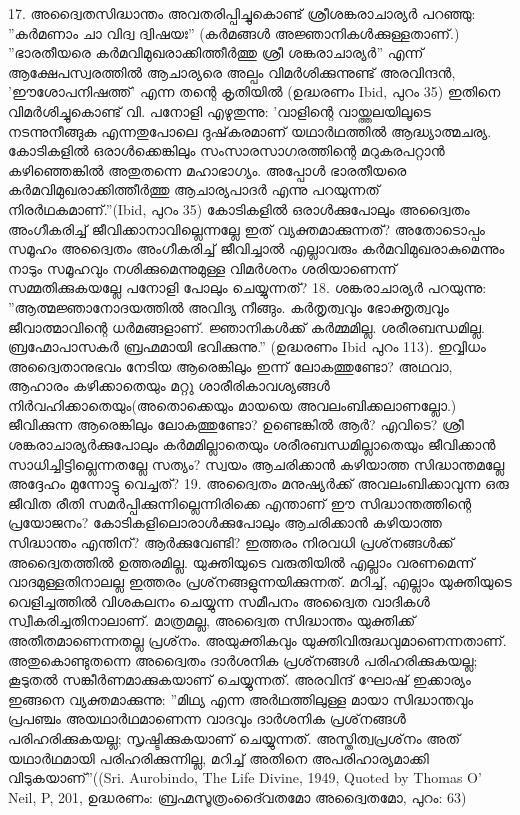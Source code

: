 17. അദ്വൈതസിദ്ധാന്തം അവതരിപ്പിച്ചുകൊണ്ട് ശ്രീശങ്കരാചാര്യര്‍ പറഞ്ഞു: ''കര്‍മണാം ചാ വിദ്വ ദ്വിഷയഃ'' (കര്‍മങ്ങള്‍ അജ്ഞാനികള്‍ക്കുള്ളതാണ്.)
''ഭാരതീയരെ കര്‍മവിമുഖരാക്കിത്തീര്‍ത്തു ശ്രീ ശങ്കരാചാര്യര്‍'' എന്ന് ആക്ഷേപസ്വരത്തില്‍ ആചാര്യരെ അല്പം വിമര്‍ശിക്കുന്നുണ്ട് അരവിന്ദന്‍, 'ഈശോപനിഷത്ത്' എന്ന തന്റെ കൃതിയില്‍ (ഉദ്ധരണം Ibid, പുറം 35)
ഇതിനെ വിമര്‍ശിച്ചുകൊണ്ട് വി. പനോളി എഴുതുന്നു: 'വാളിന്റെ വായ്ത്തലയിലൂടെ നടന്നുനീങ്ങുക എന്നതുപോലെ ദുഷ്‌കരമാണ് യഥാര്‍ഥത്തില്‍ ആദ്ധ്യാത്മചര്യ. കോടികളില്‍ ഒരാള്‍ക്കെങ്കിലും സംസാരസാഗരത്തിന്റെ മറുകരപറ്റാന്‍ കഴിഞ്ഞെങ്കില്‍ അതുതന്നെ മഹാഭാഗ്യം. അപ്പോള്‍ ഭാരതീയരെ കര്‍മവിമുഖരാക്കിത്തീര്‍ത്തു ആചാര്യപാദര്‍ എന്നു പറയുന്നത് നിരര്‍ഥകമാണ്.''(Ibid, പുറം 35)
കോടികളില്‍ ഒരാള്‍ക്കുപോലും അദ്വൈതം അംഗീകരിച്ച് ജീവിക്കാനാവില്ലെന്നല്ലേ ഇത് വ്യക്തമാക്കുന്നത്? അതോടൊപ്പം സമൂഹം അദ്വൈതം അംഗീകരിച്ച് ജീവിച്ചാല്‍ എല്ലാവരും കര്‍മവിമുഖരാകുമെന്നും നാടും സമൂഹവും നശിക്കുമെന്നുമുള്ള വിമര്‍ശനം ശരിയാണെന്ന് സമ്മതിക്കുകയല്ലേ പനോളി പോലും ചെയ്യുന്നത്?
18. ശങ്കരാചാര്യര്‍ പറയുന്നു: ''ആത്മജ്ഞാനോദയത്തില്‍ അവിദ്യ നീങ്ങും. കര്‍തൃത്വവും ഭോക്തൃത്വവും ജീവാത്മാവിന്റെ ധര്‍മങ്ങളാണ്. ജ്ഞാനികള്‍ക്ക് കര്‍മ്മമില്ല. ശരീരബന്ധമില്ല. ബ്രഹ്മോപാസകര്‍ ബ്രഹ്മമായി ഭവിക്കുന്നു.'' (ഉദ്ധരണം Ibid പുറം 113). ഇവ്വിധം അദ്വൈതാനുഭവം നേടിയ ആരെങ്കിലും ഇന്ന് ലോകത്തുണ്ടോ? അഥവാ, ആഹാരം കഴിക്കാതെയും മറ്റു ശാരീരികാവശ്യങ്ങള്‍ നിര്‍വഹിക്കാതെയും(അതൊക്കെയും മായയെ അവലംബിക്കലാണല്ലോ.) ജീവിക്കുന്ന ആരെങ്കിലും ലോകത്തുണ്ടോ? ഉണ്ടെങ്കില്‍ ആര്‍? എവിടെ? ശ്രീ ശങ്കരാചാര്യര്‍ക്കുപോലും കര്‍മമില്ലാതെയും ശരീരബന്ധമില്ലാതെയും ജീവിക്കാന്‍ സാധിച്ചിട്ടില്ലെന്നതല്ലേ സത്യം? സ്വയം ആചരിക്കാന്‍ കഴിയാത്ത സിദ്ധാന്തമല്ലേ അദ്ദേഹം മുന്നോട്ടു വെച്ചത്?
19. അദ്വൈതം മനുഷ്യര്‍ക്ക് അവലംബിക്കാവുന്ന ഒരു ജീവിത രീതി സമര്‍പ്പിക്കുന്നില്ലെന്നിരിക്കെ എന്താണ് ഈ സിദ്ധാന്തത്തിന്റെ പ്രയോജനം? കോടികളിലൊരാള്‍ക്കുപോലും ആചരിക്കാന്‍ കഴിയാത്ത സിദ്ധാന്തം എന്തിന്? ആര്‍ക്കുവേണ്ടി?
ഇത്തരം നിരവധി പ്രശ്‌നങ്ങള്‍ക്ക് അദ്വൈതത്തില്‍ ഉത്തരമില്ല. യുക്തിയുടെ വരുതിയില്‍ എല്ലാം വരണമെന്ന് വാദമുള്ളതിനാലല്ല ഇത്തരം പ്രശ്‌നങ്ങളുന്നയിക്കുന്നത്. മറിച്ച്, എല്ലാം യുക്തിയുടെ വെളിച്ചത്തില്‍ വിശകലനം ചെയ്യുന്ന സമീപനം അദ്വൈത വാദികള്‍ സ്വീകരിച്ചതിനാലാണ്. മാത്രമല്ല, അദ്വൈത സിദ്ധാന്തം യുക്തിക്ക് അതീതമാണെന്നതല്ല പ്രശ്‌നം. അയുക്തികവും യുക്തിവിരുദ്ധവുമാണെന്നതാണ്. അതുകൊണ്ടുതന്നെ അദ്വൈതം ദാര്‍ശനിക പ്രശ്‌നങ്ങള്‍ പരിഹരിക്കുകയല്ല; കൂടുതല്‍ സങ്കീര്‍ണമാക്കുകയാണ് ചെയ്യുന്നത്. അരവിന്ദ് ഘോഷ് ഇക്കാര്യം ഇങ്ങനെ വ്യക്തമാക്കുന്നു: ''മിഥ്യ എന്ന അര്‍ഥത്തിലുള്ള മായാ സിദ്ധാന്തവും പ്രപഞ്ചം അയഥാര്‍ഥമാണെന്ന വാദവും ദാര്‍ശനിക പ്രശ്‌നങ്ങള്‍ പരിഹരിക്കുകയല്ല; സൃഷ്ടിക്കുകയാണ് ചെയ്യുന്നത്. അസ്തിത്വപ്രശ്‌നം അത് യഥാര്‍ഥമായി പരിഹരിക്കുന്നില്ല, മറിച്ച് അതിനെ അപരിഹാര്യമാക്കി വിടുകയാണ്''((Sri. Aurobindo, The Life Divine, 1949, Quoted by Thomas O' Neil, P, 201, ഉദ്ധരണം: ബ്രഹ്മസൂത്രംദൈ്വതമോ അദ്വൈതമോ, പുറം: 63)
